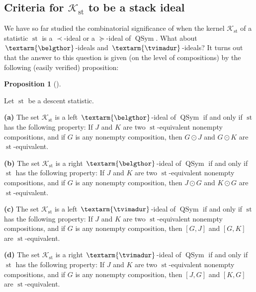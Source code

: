 \documentclass[numbers=enddot,12pt,final,onecolumn,notitlepage]{scrartcl}%
\theoremstyle{definition}
\newtheorem{prop}[theo]{Proposition}
\newenvironment{proposition}[1][]
{\begin{prop}[#1]\begin{leftbar}}
{\end{leftbar}\end{prop}}
\newenvironment{verlong}{}{}
\newcommand{\tvi}{\left. \textarm{\tvimadur} \right.}
\newcommand{\bel}{\left. \textarm{\belgthor} \right.}
\begin{document}
\begin{verlong}
\subsection{Criteria for $\mathcal{K}_{\operatorname*{st}}$ to be a stack
ideal}

We have so far studied the combinatorial significance of when the kernel
$\mathcal{K}_{\operatorname*{st}}$ of a statistic $\operatorname*{st}$ is a
$\left.  \prec\right.  $-ideal or a $\left.  \succeq\right.  $-ideal of
$\operatorname*{QSym}$. What about $\bel$-ideals and $\tvi$-ideals? It turns
out that the answer to this question is given (on the level of compositions)
by the following (easily verified) proposition:

\begin{proposition}
\label{prop.bel-tvi-comp}Let $\operatorname*{st}$ be a descent statistic.

\textbf{(a)} The set $\mathcal{K}_{\operatorname*{st}}$ is a left $\bel$-ideal
of $\operatorname*{QSym}$ if and only if $\operatorname*{st}$ has the
following property: If $J$ and $K$ are two $\operatorname*{st}$-equivalent
nonempty compositions, and if $G$ is any nonempty composition, then $G\odot J$
and $G\odot K$ are $\operatorname*{st}$-equivalent.

\textbf{(b)} The set $\mathcal{K}_{\operatorname*{st}}$ is a right
$\bel$-ideal of $\operatorname*{QSym}$ if and only if $\operatorname*{st}$ has
the following property: If $J$ and $K$ are two $\operatorname*{st}$-equivalent
nonempty compositions, and if $G$ is any nonempty composition, then $J\odot G$
and $K\odot G$ are $\operatorname*{st}$-equivalent.

\textbf{(c)} The set $\mathcal{K}_{\operatorname*{st}}$ is a left $\tvi$-ideal
of $\operatorname*{QSym}$ if and only if $\operatorname*{st}$ has the
following property: If $J$ and $K$ are two $\operatorname*{st}$-equivalent
nonempty compositions, and if $G$ is any nonempty composition, then $\left[
G,J\right]  $ and $\left[  G,K\right]  $ are $\operatorname*{st}$-equivalent.

\textbf{(d)} The set $\mathcal{K}_{\operatorname*{st}}$ is a right
$\tvi$-ideal of $\operatorname*{QSym}$ if and only if $\operatorname*{st}$ has
the following property: If $J$ and $K$ are two $\operatorname*{st}$-equivalent
nonempty compositions, and if $G$ is any nonempty composition, then $\left[
J,G\right]  $ and $\left[  K,G\right]  $ are $\operatorname*{st}$-equivalent.
\end{proposition}


\end{verlong}
\end{document}
